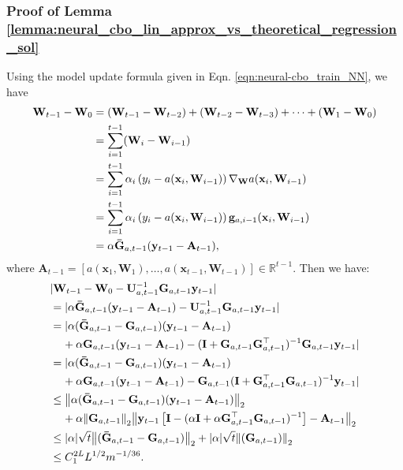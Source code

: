 \subsubsection{Proof of Lemma \ref{lemma:neural_cbo_lin_approx_vs_theoretical_regression_sol}}

Using the model update formula given in Eqn. \eqref{eqn:neural-cbo_train_NN}, we have 
\begin{align*}
    \mathbf{W}_{t-1} - \mathbf{W}_0 &= (\mathbf{W}_{t-1} - \mathbf{W}_{t-2}) + (\mathbf{W}_{t-2} - \mathbf{W}_{t-3})  + \dots + (\mathbf{W}_1 - \mathbf{W}_0) 
    \\
    &= \sum_{i=1}^{t-1}  (\mathbf{W}_{i} -  \mathbf{W}_{i-1}) 
    \\
    &= \sum_{i=1}^{t-1}  \alpha_i \left(y_i - a(\mathbf{x}_i, \mathbf{W}_{i-1})\right) \nabla_\mathbf{W} a(\mathbf{x}_i, \mathbf{W}_{i-1}) 
    \\
    & = \sum_{i=1}^{t-1}  \alpha_i \left(y_i - a(\mathbf{x}_i, \mathbf{W}_{i-1})\right) \mathbf{g}_{a, i-1} (\mathbf{x}_i, \mathbf{W}_{i-1}) 
    \\
    & = \alpha \mathbf{\Bar{G}}_{a, t-1} (\mathbf{y}_{t-1} - \mathbf{A}_{t-1}),
\end{align*}
where $\mathbf{A}_{t-1} = [a(\mathbf{x}_1, \mathbf{W}_1), \dots, a(\mathbf{x}_{t-1}, \mathbf{W}_{t-1})] \in \mathbb{R}^{t-1}$.  Then we have:
\begin{align*}
    & \lvert \mathbf{W}_{t-1} - \mathbf{W}_0 - \mathbf{U}_{a,t-1}^{-1}
    \mathbf{G}_{a,t-1} \mathbf{y}_{t-1} \rvert 
    \\
    & = \lvert  \alpha \mathbf{\Bar{G}}_{a, t-1} (\mathbf{y}_{t-1} - \mathbf{A}_{t-1}) - \mathbf{U}_{a,t-1}^{-1} \mathbf{G}_{a,t-1} \mathbf{y}_{t-1} \rvert 
    \\
    & = \lvert  \alpha (\mathbf{\Bar{G}}_{a, t-1} - \mathbf{G}_{a, t-1}) (\mathbf{y}_{t-1} - \mathbf{A}_{t-1}) 
\\
    & \;\;\;\; + \alpha \mathbf{G}_{a, t-1} (\mathbf{y}_{t-1} - \mathbf{A}_{t-1}) - (\mathbf{I} + \mathbf{G}_{a,t-1} \mathbf{G}_{a,t-1}^\top)^{-1} \mathbf{G}_{a,t-1} \mathbf{y}_{t-1} \rvert
\\
    & = \lvert  \alpha (\mathbf{\Bar{G}}_{a, t-1} - \mathbf{G}_{a, t-1}) (\mathbf{y}_{t-1} - \mathbf{A}_{t-1}) 
\\
    & \;\;\;\; + \alpha \mathbf{G}_{a, t-1} (\mathbf{y}_{t-1} - \mathbf{A}_{t-1}) - \mathbf{G}_{a,t-1}(\mathbf{I} + \mathbf{G}_{a,t-1}^\top \mathbf{G}_{a,t-1} )^{-1} \mathbf{y}_{t-1} \rvert
\\
    & \le \norm{\alpha (\mathbf{\Bar{G}}_{a, t-1} - \mathbf{G}_{a, t-1}) (\mathbf{y}_{t-1} - \mathbf{A}_{t-1})}_2 
\\
    & \;\;\;\; + \alpha \norm{\mathbf{G}_{a, t-1}}_2 \norm{ \mathbf{y}_{t-1} \left[\mathbf{I} - (\alpha\mathbf{I} + \alpha \mathbf{G}_{a,t-1}^\top \mathbf{G}_{a,t-1} )^{-1} \right] - \mathbf{A}_{t-1}}_2
\\
    & \le \lvert \alpha \rvert \sqrt{t} \norm{(\mathbf{\Bar{G}}_{a, t-1} - \mathbf{G}_{a, t-1})}_2 + \lvert \alpha \rvert \sqrt{t} \norm{(\mathbf{G}_{a, t-1})}_2
\\
    & \le C_1^{2L} L^{1/2} m^{-1/36}.
\end{align*}
